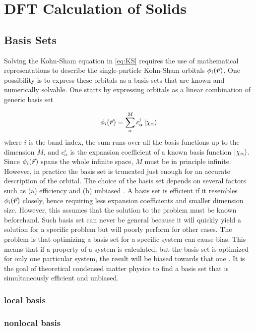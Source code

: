 \chapter{DFT Calculation of Solids}
\section{Basis Sets}
Solving the Kohn-Sham equation in \eqref{eq:KS} requires the use of mathematical representations to describe the single-particle Kohn-Sham orbitals $\phi_i(\va*{r})$. One possibility is to express these orbitals as a basis sets that are known and numerically solvable. One starts by expressing orbitals as a linear combination of generic basis set 

\begin{equation} \label{eq:basis_set}
    \phi_i(\va*{r}) = \sum^M_\alpha c^i_\alpha \ket{\chi_\alpha}
\end{equation}
where $i$ is the band index, the sum runs over all the basis functions up to the dimension $M$, and $c^i_\alpha$ is the expansion coefficient of a known basis function $\ket{\chi_\alpha}$. Since $\phi_i(\va*{r})$ spans the whole infinite space, $M$ must be in principle infinite. However, in practice the basis set is truncated just enough for an accurate description of the orbital. The choice of the basis set depends on several factors such as (a) efficiency and (b) unbiased \citep{Cottenier2013}. A basis set is efficient if it resembles  $\phi_i(\va*{r})$ closely, hence requiring less expansion coefficients and smaller dimension size. However, this assumes that the solution to the problem must be known beforehand. Such basis set can never be general because it will quickly yield a solution for a specific problem but will poorly perform for other cases. The problem is that optimizing a basis set for a specific system can cause bias. This means that if a property of a system is calculated, but the basis set is optimized for only one particular system, the result will be biased towards that one \citep{Junquera2001,Louwerse2012}. It is the goal of theoretical condensed matter physics to find a basis set that is simultaneously efficient and unbiased. 
\subsection{local basis}
\subsection{nonlocal basis}
